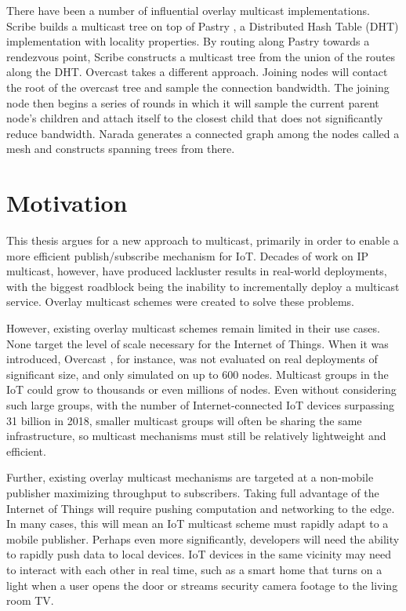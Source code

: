 There have been a number of influential overlay multicast implementations. Scribe \cite{scribe} builds a multicast tree on top of Pastry \cite{pastry}, a Distributed Hash Table (DHT) implementation with locality properties. By routing along Pastry towards a rendezvous point, Scribe constructs a multicast tree from the union of the routes along the DHT. Overcast \cite{overcast} takes a different approach. Joining nodes will contact the root of the overcast tree and sample the connection bandwidth. The joining node then begins a series of rounds in which it will sample the current parent node's children and attach itself to the closest child that does not significantly reduce bandwidth. Narada \cite{narada} generates a connected graph among the nodes called a mesh and constructs spanning trees from there.

\section{Motivation}
\label{motivation}
This thesis argues for a new approach to multicast, primarily in order to enable a more efficient publish/subscribe mechanism for IoT. Decades of work on IP multicast, however, have produced lackluster results in real-world deployments, with the biggest roadblock being the inability to incrementally deploy a multicast service. Overlay multicast schemes were created to solve these problems.

However, existing overlay multicast schemes remain limited in their use cases. None target the level of scale necessary for the Internet of Things. When it was introduced, Overcast \cite{overcast}, for instance, was not evaluated on real deployments of significant size, and only simulated on up to 600 nodes. Multicast groups in the IoT could grow to thousands or even millions of nodes. Even without considering such large groups, with the number of Internet-connected IoT devices surpassing 31 billion \cite{ihs} in 2018, smaller multicast groups will often be sharing the same infrastructure, so multicast mechanisms must still be relatively lightweight and efficient.

Further, existing overlay multicast mechanisms are targeted at a non-mobile publisher maximizing throughput to subscribers. Taking full advantage of the Internet of Things will require pushing computation and networking to the edge. In many cases, this will mean an IoT multicast scheme must rapidly adapt to a mobile publisher. Perhaps even more significantly, developers will need the ability to rapidly push data to local devices. IoT devices in the same vicinity may need to interact with each other in real time, such as a smart home that turns on a light when a user opens the door or streams security camera footage to the living room TV. 

